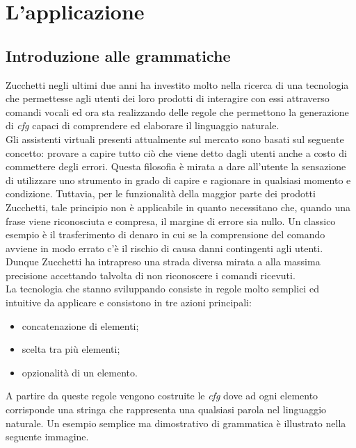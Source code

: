 
\chapter{L'applicazione}
\label{cap:applicazione}


\section{Introduzione alle grammatiche}
Zucchetti negli ultimi due anni ha investito molto nella ricerca di una tecnologia che permettesse agli utenti dei loro prodotti di interagire con essi attraverso comandi vocali ed ora sta realizzando delle regole che permettono la generazione di \emph{\gls{cfg}} capaci di comprendere ed elaborare il linguaggio naturale. \\
Gli assistenti virtuali presenti attualmente sul mercato sono basati sul seguente concetto: provare a capire tutto ciò che viene detto dagli utenti anche a costo di commettere degli errori. Questa filosofia è mirata a dare all'utente la sensazione di utilizzare uno strumento in grado di capire e ragionare in qualsiasi momento e condizione. Tuttavia, per le funzionalità della maggior parte dei prodotti Zucchetti, tale principio non è applicabile in quanto necessitano che, quando una frase viene riconosciuta e compresa, il margine di errore sia nullo. Un classico esempio è il trasferimento di denaro in cui se la comprensione del comando avviene in modo errato c'è il rischio di causa danni contingenti agli utenti. Dunque Zucchetti ha intrapreso una strada diversa mirata a alla massima precisione accettando talvolta di non riconoscere i comandi ricevuti. \\
La tecnologia che stanno sviluppando consiste in regole molto semplici ed intuitive da applicare e consistono in tre azioni principali:
\begin{itemize}
	\item concatenazione di elementi;
	\item scelta tra più elementi;
	\item opzionalità di un elemento.
\end{itemize}
A partire da queste regole vengono costruite le \emph{\gls{cfg}} dove ad ogni elemento corrisponde una stringa che rappresenta una qualsiasi parola nel linguaggio naturale. Un esempio semplice ma dimostrativo di grammatica è illustrato nella seguente immagine.

